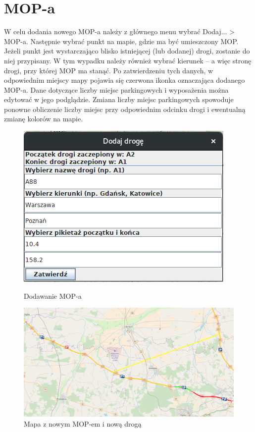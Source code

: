 \documentclass[10pt,paper=a4 BCOR0, DIV15, titlepage=false, oneside]{scrbook} %
\begin{document}
      \section{MOP-a}
      W celu dodania nowego MOP-a należy z głównego menu wybrać Dodaj... >
      MOP-a. Następnie wybrać punkt na mapie, gdzie ma być umieszczony MOP.
      Jeżeli punkt jest wystarczająco blisko istniejącej (lub dodanej) drogi,
      zostanie do niej przypisany. W tym wypadku należy również wybrać kierunek
      -- a więc stronę drogi, przy której MOP ma stanąć. Po zatwierdzeniu tych
      danych, w odpowiednim miejscy mapy pojawia się czerwona ikonka
      oznaczająca dodanego MOP-a. Dane dotyczące liczby miejsc parkingowych i
      wyposażenia można edytować w jego podglądzie. Zmiana liczby miejsc
      parkingowych spowoduje ponowne obliczenie liczby miejsc przy odpowiednim
      odcinku drogi i ewentualną zmianę kolorów na mapie. 

     \begin{figure}[ht]
       \begin{minipage}{.3\textwidth}
        \centering
       \includegraphics[width=.9\linewidth]{dodawanie_drogi.png}
        \caption{Dodawanie MOP-a}
      \end{minipage}%
      \begin{minipage}{.6\textwidth}
        \centering
       \includegraphics[width=.9\linewidth]{dodany_mop_droga.png}
        \caption{Mapa z nowym MOP-em i nową drogą}
      \end{minipage}
      \end{figure}
\end{document}
